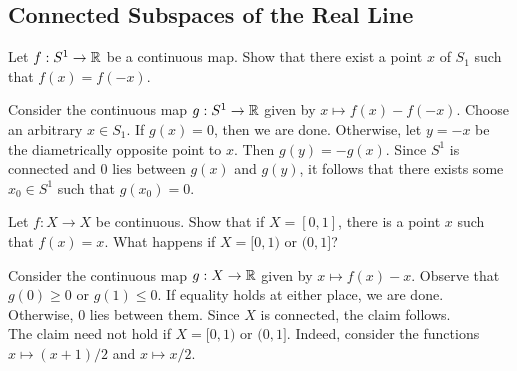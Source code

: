 
\subsection{Connected Subspaces of the Real Line}

	\setcounter{exercise}{1}
	\begin{exercise}
		Let $f:S^1\to\mathbb{R}$ be a continuous map. Show that there exist a point $x$ of $S_1$ such that $f(x)=f(-x)$.
	\end{exercise}
	\begin{solution*}
		Consider the continuous map $g:S^1\to\mathbb{R}$ given by $x\mapsto f(x)-f(-x)$. Choose an arbitrary $x\in S_1$. If $g(x)=0$, then we are done. Otherwise, let $y=-x$ be the diametrically opposite point to $x$. Then $g(y)=-g(x)$. Since $S^1$ is connected and $0$ lies between $g(x)$ and $g(y)$, it follows that there exists some $x_0\in S^1$ such that $g(x_0)=0$.
	\end{solution*}

	\begin{exercise}
		Let $f:X\to X$ be continuous. Show that if $X=[0,1]$, there is a point $x$ such that $f(x)=x$. What happens if $X=[0,1)$ or $(0,1]$?
	\end{exercise}
	\begin{solution*}
		Consider the continuous map $g:X\to\mathbb{R}$ given by $x\mapsto f(x)-x$. Observe that $g(0)\geq 0$ or $g(1)\leq 0$. If equality holds at either place, we are done. Otherwise, $0$ lies between them. Since $X$ is connected, the claim follows.\\
		The claim need not hold if $X=[0,1)$ or $(0,1]$. Indeed, consider the functions $x\mapsto (x+1)/2$ and $x\mapsto x/2$.
	\end{solution*}


